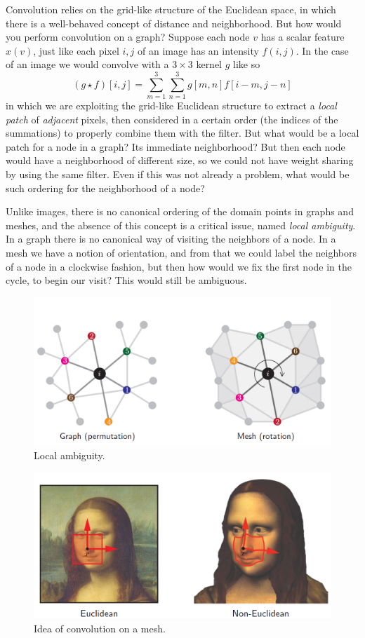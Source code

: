 Convolution relies on the grid-like structure of the Euclidean space, in which there is a well-behaved concept of distance and neighborhood. But how would you perform convolution on a graph?
Suppose each node $v$ has a scalar feature $x(v)$, just like each pixel $i, j$ of an image has an intensity $f(i, j)$. In the case of an image we would convolve with a $3 \times 3$ kernel $g$ like so
\begin{equation}
    (g \star f)[i, j] = \sum_{m = 1}^3 \sum_{n = 1}^3 g[m, n] f[i-m, j-n]
\end{equation}
in which we are exploiting the grid-like Euclidean structure to extract a \emph{local patch} of \emph{adjacent} pixels, then considered in a certain order (the indices of the summations) to properly combine them with the filter. But what would be a local patch for a node in a graph? Its immediate neighborhood? But then each node would have a neighborhood of different size, so we could not have weight sharing by using the same filter. Even if this was not already a problem, what would be such ordering for the neighborhood of a node?

Unlike images, there is no canonical ordering of the domain points in graphs and meshes, and the absence of this concept is a critical issue, named \emph{local ambiguity}. In a graph there is no canonical way of visiting the neighbors of a node. In a mesh we have a notion of orientation, and from that we could label the neighbors of a node in a clockwise fashion, but then how would we fix the first node in the cycle, to begin our visit? This would still be ambiguous.
\begin{figure}[H]
    \centering
    \includegraphics[width=.7\textwidth]{figures/12/local.png}
    \caption{Local ambiguity.}
\end{figure}

\begin{figure}[H]
    \centering
    \includegraphics[width=.7\textwidth]{figures/12/monalisa-conv.png}
    \caption{Idea of convolution on a mesh.}
\end{figure}

